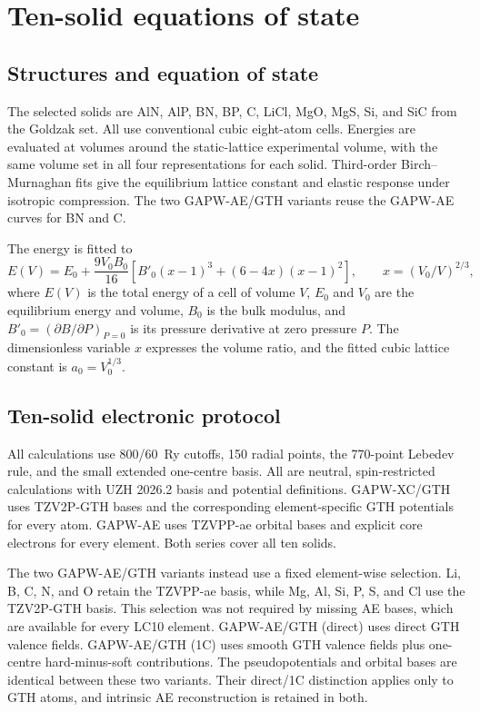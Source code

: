 \documentclass[10pt,a4paper]{article}
\begin{document}
\FloatBarrier

\section{Ten-solid equations of state}
\label{sec:solids}

\subsection{Structures and equation of state}
\label{sec:solid-structures}

The selected solids are AlN, AlP, BN, BP, C, LiCl, MgO, MgS, Si, and SiC from the Goldzak set.\cite{Goldzak2022Solids} All use conventional cubic eight-atom cells. Energies are evaluated at volumes around the static-lattice experimental volume, with the same volume set in all four representations for each solid. Third-order Birch--Murnaghan fits give the equilibrium lattice constant and elastic response under isotropic compression. The two GAPW-AE/GTH variants reuse the GAPW-AE curves for BN and C.

The energy is fitted to
\begin{equation}
 E(V)=E_0+\frac{9V_0B_0}{16}
 \left[B'_0(x-1)^3+(6-4x)(x-1)^2\right],\qquad
 x=(V_0/V)^{2/3},
\end{equation}
where $E(V)$ is the total energy of a cell of volume $V$, $E_0$ and $V_0$ are the equilibrium energy and volume, $B_0$ is the bulk modulus, and $B'_0=(\partial B/\partial P)_{P=0}$ is its pressure derivative at zero pressure $P$. The dimensionless variable $x$ expresses the volume ratio, and the fitted cubic lattice constant is $a_0=V_0^{1/3}$.

\subsection{Ten-solid electronic protocol}
\label{sec:solid-settings}

All calculations use 800/60~Ry cutoffs, 150 radial points, the 770-point Lebedev rule, and the small extended one-centre basis. All are neutral, spin-restricted calculations with UZH 2026.2 basis and potential definitions.\cite{Mirhosseini2026UZH} GAPW-XC/GTH uses TZV2P-GTH bases and the corresponding element-specific GTH potentials for every atom. GAPW-AE uses TZVPP-ae orbital bases and explicit core electrons for every element. Both series cover all ten solids.

The two GAPW-AE/GTH variants instead use a fixed element-wise selection. Li, B, C, N, and O retain the TZVPP-ae basis, while Mg, Al, Si, P, S, and Cl use the TZV2P-GTH basis. This selection was not required by missing AE bases, which are available for every LC10 element. GAPW-AE/GTH (direct) uses direct GTH valence fields. GAPW-AE/GTH (1C) uses smooth GTH valence fields plus one-centre hard-minus-soft contributions. The pseudopotentials and orbital bases are identical between these two variants. Their direct/1C distinction applies only to GTH atoms, and intrinsic AE reconstruction is retained in both.
\end{document}
